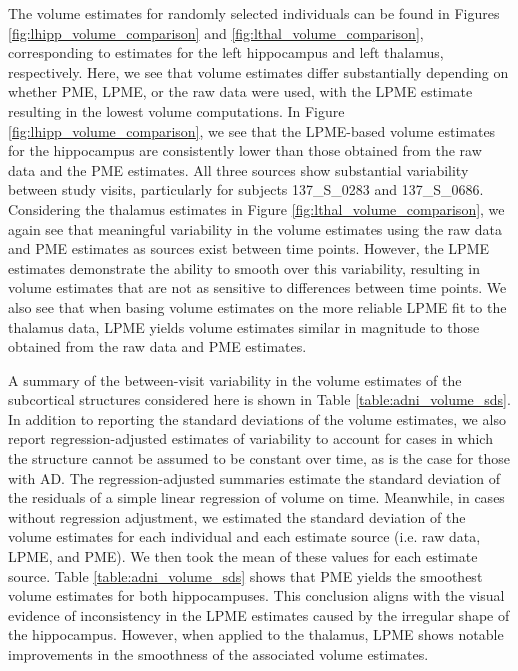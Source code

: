 \documentclass[11pt,reqno]{article}
\theoremstyle{definition}
\begin{document}
The volume estimates for randomly selected individuals can be found in Figures \ref{fig:lhipp_volume_comparison} and \ref{fig:lthal_volume_comparison}, corresponding to estimates for the left hippocampus and left thalamus, respectively. Here, we see that volume estimates differ substantially depending on whether PME, LPME, or the raw data were used, with the LPME estimate resulting in the lowest volume computations. In Figure \ref{fig:lhipp_volume_comparison}, we see that the LPME-based volume estimates for the hippocampus are consistently lower than those obtained from the raw data and the PME estimates. All three sources show substantial variability between study visits, particularly for subjects 137\_S\_0283 and 137\_S\_0686. Considering the thalamus estimates in Figure \ref{fig:lthal_volume_comparison}, we again see that meaningful variability in the volume estimates using the raw data and PME estimates as sources exist between time points. However, the LPME estimates demonstrate the ability to smooth over this variability, resulting in volume estimates that are not as sensitive to differences between time points. We also see that when basing volume estimates on the more reliable LPME fit to the thalamus data, LPME yields volume estimates similar in magnitude to those obtained from the raw data and PME estimates.

A summary of the between-visit variability in the volume estimates of the subcortical structures considered here is shown in Table \ref{table:adni_volume_sds}. In addition to reporting the standard deviations of the volume estimates, we also report regression-adjusted estimates of variability to account for cases in which the structure cannot be assumed to be constant over time, as is the case for those with AD. The regression-adjusted summaries estimate the standard deviation of the residuals of a simple linear regression of volume on time. Meanwhile, in cases without regression adjustment, we estimated the standard deviation of the volume estimates for each individual and each estimate source (i.e. raw data, LPME, and PME). We then took the mean of these values for each estimate source. Table \ref{table:adni_volume_sds} shows that PME yields the smoothest volume estimates for both hippocampuses. This conclusion aligns with the visual evidence of inconsistency in the LPME estimates caused by the irregular shape of the hippocampus. However, when applied to the thalamus, LPME shows notable improvements in the smoothness of the associated volume estimates.
\end{document}
